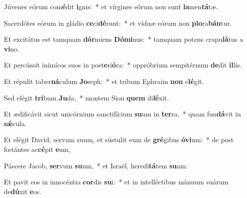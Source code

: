 \item Júvenes eórum com\textbf{é}dit \textbf{i}gnis:~* et vírgines eórum non sunt \textbf{la}men\textbf{tá}tæ.
\item Sacerdótes eórum in gládio \textbf{ce}ci\textbf{dé}runt:~* et víduæ eórum non \textbf{plo}ra\textbf{bán}tur.
\item Et excitátus est tamquam \textbf{dór}miens \textbf{Dó}\textbf{mi}nus:~* tamquam potens crapu\textbf{lá}tus a \textbf{vi}no.
\item Et percússit inimícos suos in post\textbf{e}ri\textbf{ó}ra:~* oppróbrium sempitérnum \textbf{de}dit \textbf{il}lis.
\item Et répulit taber\textbf{ná}culum \textbf{Jo}seph:~* et tribum Ephraim \textbf{non} e\textbf{lé}git.
\item Sed elégit \textbf{tri}bum \textbf{Ju}da,~* montem Sion \textbf{quem} di\textbf{lé}xit.
\item Et ædificávit sicut unicórnium sanctifícium \textbf{su}um in \textbf{ter}ra,~* quam fun\textbf{dá}vit in \textbf{sǽ}cula.
\item Et elégit David, servum suum, et sústulit eum de \textbf{gré}gibus \textbf{ó}\textbf{vi}um:~* de post fœtántes ac\textbf{cé}pit \textbf{e}um,
\item Páscere Jacob, \textbf{ser}vum \textbf{su}um,~* et Israël, heredi\textbf{tá}tem \textbf{su}am:
\item Et pavit eos in innocéntia \textbf{cor}dis \textbf{su}i:~* et in intelléctibus mánuum suárum de\textbf{dú}xit \textbf{e}os.
